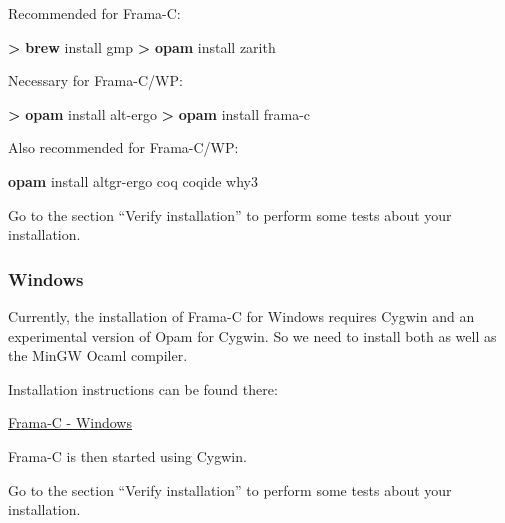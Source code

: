 \documentclass[12pt,francais,]{scrbook}
\newenvironment{Shaded}{}{}
\newcommand{\KeywordTok}[1]{\textcolor[rgb]{0.00,0.44,0.13}{\textbf{{#1}}}}
\newcommand{\NormalTok}[1]{{#1}}
\begin{document}
Recommended for Frama-C:

\begin{footnotesize}\begin{Shaded}
\begin{Highlighting}[]
\KeywordTok{>} \KeywordTok{brew} \NormalTok{install gmp}
\KeywordTok{>} \KeywordTok{opam} \NormalTok{install zarith}
\end{Highlighting}
\end{Shaded}\end{footnotesize}

Necessary for Frama-C/WP:

\begin{footnotesize}\begin{Shaded}
\begin{Highlighting}[]
\KeywordTok{>} \KeywordTok{opam} \NormalTok{install alt-ergo}
\KeywordTok{>} \KeywordTok{opam} \NormalTok{install frama-c}
\end{Highlighting}
\end{Shaded}\end{footnotesize}

Also recommended for Frama-C/WP:

\begin{footnotesize}\begin{Shaded}
\begin{Highlighting}[]
\KeywordTok{opam} \NormalTok{install altgr-ergo coq coqide why3}
\end{Highlighting}
\end{Shaded}\end{footnotesize}

Go to the section ``Verify installation'' to perform some tests about
your installation.

\subsubsection{Windows}\label{windows}

Currently, the installation of Frama-C for Windows requires Cygwin and
an experimental version of Opam for Cygwin. So we need to install both
as well as the MinGW Ocaml compiler.

Installation instructions can be found there:

\href{https://bts.frama-c.com/dokuwiki/doku.php?id=mantis:frama-c:compiling_from_source}{Frama-C
- Windows}

Frama-C is then started using Cygwin.

Go to the section ``Verify installation'' to perform some tests about
your installation.
\end{document}
